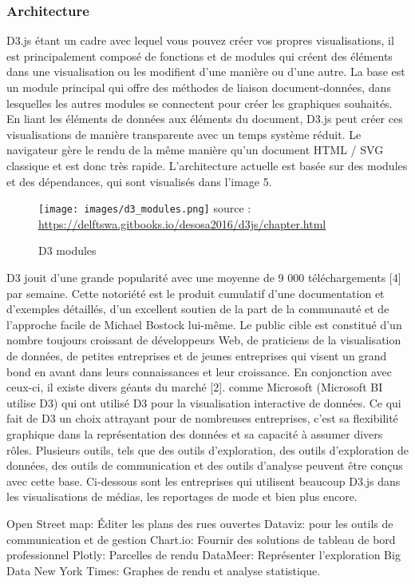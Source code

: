 \documentclass[french, a4paper, 12pt]{report}
\begin{document}
\subsubsection{Architecture}
D3.js étant un cadre avec lequel vous pouvez créer vos propres visualisations, il est principalement composé de fonctions et de modules qui créent des éléments dans une visualisation ou les modifient d’une manière ou d’une autre. La base est un module principal qui offre des méthodes de liaison document-données, dans lesquelles les autres modules se connectent pour créer les graphiques souhaités. En liant les éléments de données aux éléments du document, D3.js peut créer ces visualisations de manière transparente avec un temps système réduit. Le navigateur gère le rendu de la même manière qu’un document HTML / SVG classique et est donc très rapide.
L'architecture actuelle est basée sur des modules et des dépendances, qui sont visualisés dans l'image 5.
\begin{figure}[!htp]
    \centering
    \texttt{[image: images/d3\_modules.png]}
    \scriptsize{source : \url{https://delftswa.gitbooks.io/desosa2016/d3js/chapter.html}}
    \caption{D3 modules}
    \label{fig:1.16}
\end{figure}
D3 jouit d'une grande popularité avec une moyenne de 9 000 téléchargements [4] par semaine. Cette notoriété est le produit cumulatif d’une documentation et d’exemples détaillés, d’un excellent soutien de la part de la communauté et de l’approche facile de Michael Bostock lui-même. Le public cible est constitué d'un nombre toujours croissant de développeurs Web, de praticiens de la visualisation de données, de petites entreprises et de jeunes entreprises qui visent un grand bond en avant dans leurs connaissances et leur croissance. En conjonction avec ceux-ci, il existe divers géants du marché [2]. comme Microsoft (Microsoft BI utilise D3) qui ont utilisé D3 pour la visualisation interactive de données. Ce qui fait de D3 un choix attrayant pour de nombreuses entreprises, c’est sa flexibilité graphique dans la représentation des données et sa capacité à assumer divers rôles. Plusieurs outils, tels que des outils d'exploration, des outils d'exploration de données, des outils de communication et des outils d'analyse peuvent être conçus avec cette base. Ci-dessous sont les entreprises qui utilisent beaucoup D3.js dans les visualisations de médias, les reportages de mode et bien plus encore.

Open Street map: Éditer les plans des rues ouvertes
Dataviz: pour les outils de communication et de gestion
Chart.io: Fournir des solutions de tableau de bord professionnel
Plotly: Parcelles de rendu
DataMeer: Représenter l'exploration Big Data
New York Times: Graphes de rendu et analyse statistique.
\end{document}
